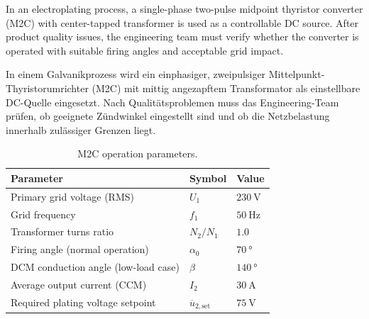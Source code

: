 

In an electroplating process, a single-phase two-pulse midpoint thyristor converter (M2C)
with center-tapped transformer is used as a controllable DC source.
After product quality issues, the engineering team must verify whether the converter is operated
with suitable firing angles and acceptable grid impact.

\begin{germanblock}
	In einem Galvanikprozess wird ein einphasiger, zweipulsiger Mittelpunkt-Thyristorumrichter (M2C)
	mit mittig angezapftem Transformator als einstellbare DC-Quelle eingesetzt.
	Nach Qualitätsproblemen muss das Engineering-Team prüfen, ob geeignete Zündwinkel eingestellt sind
	und ob die Netzbelastung innerhalb zulässiger Grenzen liegt.
\end{germanblock}



\begin{table}[ht]
	\centering
	\begin{tabular}{lll}
		\toprule
		Parameter                            & Symbol                          & Value               \\
		\midrule
		Primary grid voltage (RMS)           & $U_1$                           & $\SI{230}{\volt}$   \\
		Grid frequency                       & $f_1$                           & $\SI{50}{\hertz}$   \\
		Transformer turns ratio              & $N_2/N_1$                       & $1.0$               \\
		Firing angle (normal operation)      & $\alpha_0$                      & $\SI{70}{\degree}$  \\
		DCM conduction angle (low-load case) & $\beta$                         & $\SI{140}{\degree}$ \\
		Average output current (CCM)         & $I_2$                           & $\SI{30}{\ampere}$  \\
		Required plating voltage setpoint    & $\overline{u}_{2,\mathrm{set}}$ & $\SI{75}{\volt}$    \\
		\bottomrule
	\end{tabular}
	\caption{M2C operation parameters.}
	\label{tab:task03_parameters}
\end{table}

